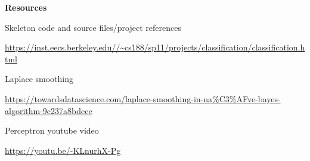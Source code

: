 \documentclass{article}
\theoremstyle{definition}
\begin{document}

\begin{newpage}
\end{newpage}
\begin{center}
\item \textbf{Resources}
\end{center}


\begin{center} Skeleton code and source files/project references \end{center}
\url{https://inst.eecs.berkeley.edu//~cs188/sp11/projects/classification/classification.html}
\begin{center} Laplace smoothing \end{center}
\url{https://towardsdatascience.com/laplace-smoothing-in-na\%C3\%AFve-bayes-algorithm-9c237a8bdece}
\begin{center} Perceptron youtube video
\item
\url{https://youtu.be/-KLnurhX-Pg}
\end{center} 
\end{document}
